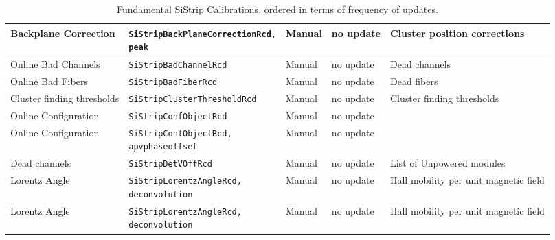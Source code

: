 \begin{table}[h!]
\begin{adjustbox}{max width=\textwidth}
\begin{tabular}{p{3.4cm}|p{4.6cm}|p{2.5cm}|p{2.5cm}|p{3.5cm}}
      Backplane Correction       & \parbox[t]{5cm}{\texttt{SiStripBackPlaneCorrectionRcd,}\\\texttt{peak}}           &   Manual                   & no update                               & Cluster position corrections   \\ \hline          
      Online Bad Channels        & \texttt{SiStripBadChannelRcd}           &   Manual                                & no update                               & Dead channels  \\ \hline                                      
      Online Bad Fibers          & \texttt{SiStripBadFiberRcd}             &   Manual                                & no update                               & Dead fibers  \\ \hline                                        
      Cluster finding thresholds & \texttt{SiStripClusterThresholdRcd}     &   Manual                                & no update                               & Cluster finding thresholds   \\ \hline
      Online Configuration       & \texttt{SiStripConfObjectRcd}           &   Manual                                & no update                               &    \\ \hline                            
      Online Configuration       & \parbox[t]{5cm}{\texttt{SiStripConfObjectRcd,}\\\texttt{apvphaseoffset}}  &   Manual   & no update                               &  \\ \hline
      Dead channels              & \texttt{SiStripDetVOffRcd}              &   Manual                                & no update                               & List of Unpowered modules  \\ \hline
      Lorentz Angle              & \parbox[t]{5cm}{\texttt{SiStripLorentzAngleRcd,}\\\texttt{deconvolution}} &   Manual & no update & Hall mobility per unit magnetic field  \\ \hline
      Lorentz Angle              & \parbox[t]{5cm}{\texttt{SiStripLorentzAngleRcd,}\\\texttt{deconvolution}} &   Manual & no update & Hall mobility per unit magnetic field  \\ \hline
    \end{tabular}
    \end{adjustbox}
    \caption{Fundamental SiStrip Calibrations, ordered in terms of frequency of updates.}
    \label{tab:StripCalibrations_critical}
\end{table}

